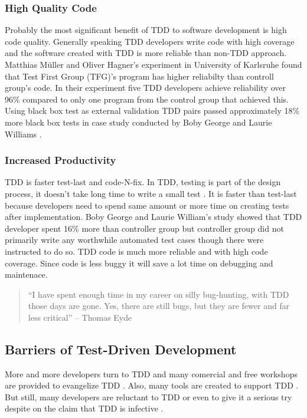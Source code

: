 \subsubsection{High Quality Code}
Probably the most significant benefit of TDD to software development is
high code quality. Generally speaking TDD developers write code with high
coverage and the software created with TDD is more reliable than non-TDD
approach. Matthias M\"uller and Oliver Hagner's experiment in University of
Karlsruhe found that Test First Group (TFG)'s program has higher reliabilty
than controll group's code. In their experiment five TDD developers achieve
reliability over 96\% compared to only one program from the control group
that achieved this\cite{Muller:02}. Using black box test as external
validation TDD pairs passed approximately 18\% more black box tests in case
study conducted by Boby George and Laurie Williams \cite{George:03}.

\subsubsection{Increased Productivity}
TDD is faster test-last and code-N-fix. In TDD, testing is part of the
design process, it doesn't take long time to write a small test
\cite{MemoRandaBlog}. It is faster than test-last because developers need
to spend same amount or more time on creating tests after implementation.
Boby George and Laurie William's study showed that TDD developer spent 16\%
more than controller group but controller group did not primarily write any
worthwhile automated test cases though there were instructed to do so. TDD
code is much more reliable and with high code coverage. Since code is less
buggy it will save a lot time on debugging and maintenace.
\begin{quote}
``I have spent enough time in my career on silly bug-hunting, with TDD those
days are gone. Yes, there are still bugs, but they are fewer and far less
critical'' -- Thomas Eyde \cite{ExtremeJSBlog}
\end{quote}

\subsection{Barriers of Test-Driven Development}
More and more developers turn to TDD and many comercial and free workshops
are provided to evangelize TDD
\cite{TestDrivenDotComWeblogs,TestDrivenDotComArticle}.  Also, many tools
are created to support TDD \cite{TestDrivenDotComTools}. But still, many
developers are reluctant to TDD or even to give it a serious try despite on
the claim that TDD is infective \cite{Beck:03,TestInfected,EichertBlog,MasonBlog}. 
